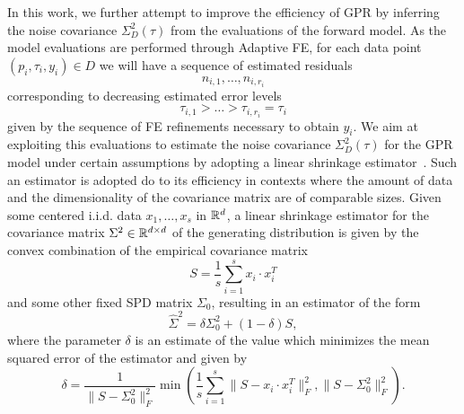 In this work, we further attempt to improve the efficiency of GPR by inferring the noise covariance $\Sigma^2_D(\tau)$ from the evaluations of the forward model.\newline
As the model evaluations are performed through Adaptive FE, for each data point $(p_i, \tau_i, y_i) \in D$ we will have a sequence of estimated residuals 
\begin{equation}\label{eq:eval-seq}
     n_{i,1}, \dots, n_{i,r_i}
\end{equation} 
    corresponding to decreasing estimated error levels 
\begin{equation} \label{eq:tol-seq}
        \tau_{i,1} > \dots > \tau_{i,r_i} = \tau_i
\end{equation}
given by the sequence of FE refinements necessary to obtain $y_i$.
We aim at exploiting this evaluations to estimate the noise covariance $\Sigma^2_D(\tau)$ for the GPR model under certain assumptions by adopting a linear shrinkage estimator~\cite{LedoitWolf2004b}. 
Such an estimator is adopted do to its efficiency in contexts where the amount of data and the dimensionality of the covariance matrix are of comparable sizes. \newline
Given some centered i.i.d. data $x_1,\dots, x_s$ in $\mathbb{R}^d$, a linear shrinkage estimator for the covariance matrix $\Sigma^2 \in \mathbb{R}^{d\times d}$ of the generating distribution is given by the convex combination of the empirical covariance matrix 
\begin{equation}\label{eq:empirical-cov}
    S = \frac{1}{s} \sum_{i=1}^s x_i \cdot x_i^T
\end{equation}
and some other fixed SPD matrix $\Sigma_0$, resulting in an estimator of the form
\begin{equation}\label{eq:shrinkage-estimator-gen}
    \hat \Sigma^2 = \delta \Sigma^2_0 + (1-\delta) S,
\end{equation}
where the parameter $\delta$ is an estimate of the value which minimizes the mean squared error of the estimator and given by 
\begin{equation} \label{eq:shrinkage-delta}
    \delta = \frac{1}{\big \|S - \Sigma^2_0 \big \|_F^2} \min \left( \frac{1}{s} \sum_{i=1}^{s} \big \|S - x_i \cdot x_i^T\big \|_F^2, \big \|S - \Sigma^2_0 \big\|_F^2 \right).
\end{equation}\medbreak


